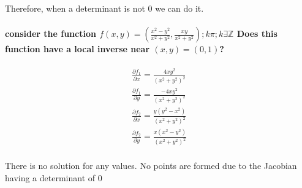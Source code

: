 \documentclass[11pt,fleqn]{book} %
\begin{document}
Therefore, when a determinant is not 0 we can do it.

\paragraph{consider the function $f(x,y)=(\frac{x^2-y^2}{x^2+y^2}, \frac{xy}{x^2 + y^2}) ; k \pi ; k \exists \mathbb{Z} $
Does this function have a local inverse near $(x,y) = (0,1)$?}

\begin{gather}
    \frac{\partial f_1}{\partial x} = \frac{4xy^2}{(x^2+y^2)^2}\\
    \frac{\partial f_1}{\partial y} = \frac{-4xy^2}{(x^2+y^2)^2} \\
    \frac{\partial f_2}{\partial x} = \frac{y(y^2-x^2)}{(x^2+y^2)^2}\\
    \frac{\partial f_2}{\partial y} = \frac{x(x^2-y^2)}{(x^2+y^2)^2} \\
\end{gather}

There is no solution for any values. No points are formed due to the Jacobian having a determinant of 0
\end{document}
